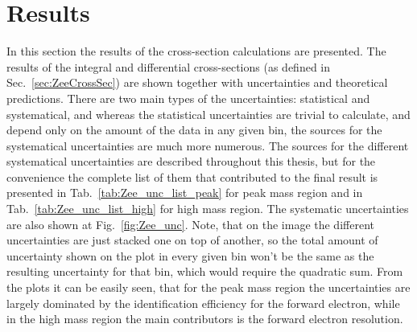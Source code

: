 \chapter{Results}
\label{sec:Results}

In this section the results of the cross-section calculations are presented. The results of the integral and differential cross-sections (as defined in Sec.~\ref{sec:ZeeCrossSec}) are shown together with uncertainties and theoretical predictions. There are two main types of the uncertainties: statistical and systematical, and whereas the statistical uncertainties are trivial to calculate, and depend only on the amount of the data in any given bin, the sources for the systematical uncertainties are much more numerous. The sources for the different systematical uncertainties are described throughout this thesis, but for the convenience the complete list of them that contributed to the final result is presented in Tab.~\ref{tab:Zee_unc_list_peak} for peak mass region and in Tab.~\ref{tab:Zee_unc_list_high} for high mass region. The systematic uncertainties are also shown at Fig.~\ref{fig:Zee_unc}. Note, that on the image the different uncertainties are just stacked one on top of another, so the total amount of uncertainty shown on the plot in every given bin won't be the same as the resulting uncertainty for that bin, which would require the quadratic sum. From the plots it can be easily seen, that for the peak mass region the uncertainties are largely dominated by the identification efficiency for the forward electron, while in the high mass region the main contributors is the forward electron resolution.


